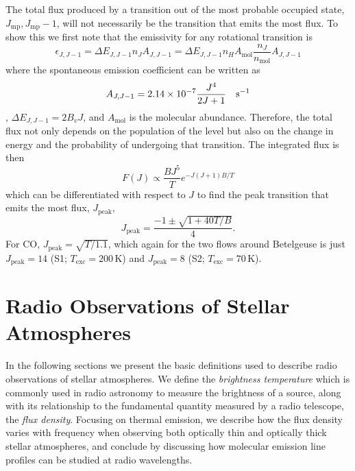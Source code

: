 The total flux produced by a transition out of the most probable occupied state, $J_{\mathrm{mp}}, J_{\mathrm{mp}}-1$, will not necessarily be the transition that emits the most flux. To show this we first note that the emissivity for any rotational transition is
\begin{equation}
\epsilon _{J,J-1}=\Delta E_{J,J-1}n_{J}A_{{J,J-1}} = \Delta E_{J,J-1}n_{H}A_{\mathrm{mol}}\frac{n_{J}}{n_{\mathrm{mol}}}A_{{J,J-1}}
\end{equation}
where the spontaneous emission coefficient can be written as
\begin{equation}
A_{J,J-1} =2.14\times 10^{-7}\frac{J^4}{2J+1} \ \ \ \rm{s}^{-1}
\end{equation}\label{eq:1.27aa}
\citep{draine_2011}, $\Delta E_{J,J-1}=2B_{v}J$, and $A_{\mathrm{mol}}$ is the molecular abundance. Therefore, the total flux not only depends on the population of the level but also on the change in energy and the probability of undergoing that transition. The integrated flux is then
\begin{equation}
F(J)\propto \frac{BJ^5}{T}e^{-J(J+1)B/T}
\end{equation}
which can be differentiated with respect to $J$ to find the peak transition that emits the most flux, $J_{\mathrm{peak}}$,
\begin{equation}
J_{\mathrm{peak}} = \frac{-1 \pm \sqrt{1+40T/B}}{4}.
\end{equation}
For CO, $J_{\mathrm{peak}} = \sqrt{T/1.1}$, which again for the two flows around Betelgeuse is just $J_{\mathrm{peak}}=14$ (S1; $T_{\mathrm{exc}}=200$\,K) and $J_{\mathrm{peak}}=8$ (S2; $T_{\mathrm{exc}}=70$\,K). 

\section{Radio Observations of Stellar Atmospheres}\label{sec:1.8}
In the following sections we present the basic definitions used to describe radio observations of stellar atmospheres. We define the \textit{brightness temperature} which is commonly used in radio astronomy to measure the brightness of a source, along with its relationship to the fundamental quantity measured by a radio telescope, the \textit{flux density}. Focusing on thermal emission, we describe how the flux density varies with frequency when observing both optically thin and optically thick stellar atmospheres, and conclude by discussing how molecular emission line profiles can be studied at radio wavelengths.

